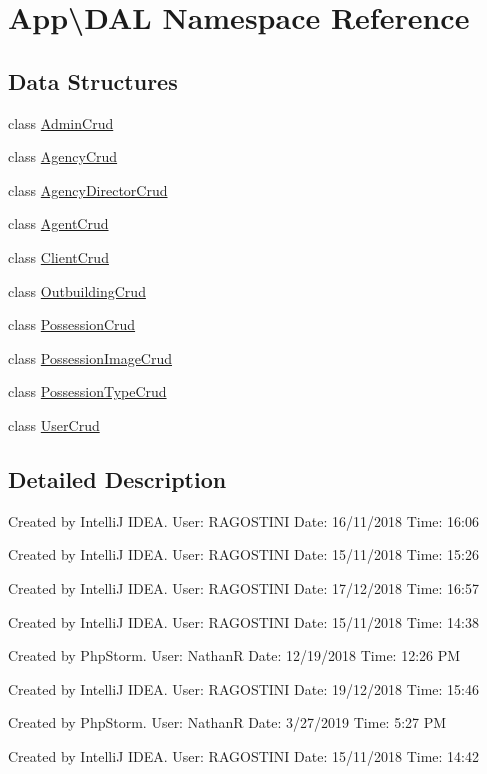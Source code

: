\hypertarget{namespace_app_1_1_d_a_l}{}\section{App\textbackslash{}D\+AL Namespace Reference}
\label{namespace_app_1_1_d_a_l}
\subsection*{Data Structures}
\begin{DoxyCompactItemize}
\item 
class \mbox{\hyperlink{class_app_1_1_d_a_l_1_1_admin_crud}{Admin\+Crud}}
\item 
class \mbox{\hyperlink{class_app_1_1_d_a_l_1_1_agency_crud}{Agency\+Crud}}
\item 
class \mbox{\hyperlink{class_app_1_1_d_a_l_1_1_agency_director_crud}{Agency\+Director\+Crud}}
\item 
class \mbox{\hyperlink{class_app_1_1_d_a_l_1_1_agent_crud}{Agent\+Crud}}
\item 
class \mbox{\hyperlink{class_app_1_1_d_a_l_1_1_client_crud}{Client\+Crud}}
\item 
class \mbox{\hyperlink{class_app_1_1_d_a_l_1_1_outbuilding_crud}{Outbuilding\+Crud}}
\item 
class \mbox{\hyperlink{class_app_1_1_d_a_l_1_1_possession_crud}{Possession\+Crud}}
\item 
class \mbox{\hyperlink{class_app_1_1_d_a_l_1_1_possession_image_crud}{Possession\+Image\+Crud}}
\item 
class \mbox{\hyperlink{class_app_1_1_d_a_l_1_1_possession_type_crud}{Possession\+Type\+Crud}}
\item 
class \mbox{\hyperlink{class_app_1_1_d_a_l_1_1_user_crud}{User\+Crud}}
\end{DoxyCompactItemize}


\subsection{Detailed Description}
Created by IntelliJ I\+D\+EA. User\+: R\+A\+G\+O\+S\+T\+I\+NI Date\+: 16/11/2018 Time\+: 16\+:06

Created by IntelliJ I\+D\+EA. User\+: R\+A\+G\+O\+S\+T\+I\+NI Date\+: 15/11/2018 Time\+: 15\+:26

Created by IntelliJ I\+D\+EA. User\+: R\+A\+G\+O\+S\+T\+I\+NI Date\+: 17/12/2018 Time\+: 16\+:57

Created by IntelliJ I\+D\+EA. User\+: R\+A\+G\+O\+S\+T\+I\+NI Date\+: 15/11/2018 Time\+: 14\+:38

Created by Php\+Storm. User\+: NathanR Date\+: 12/19/2018 Time\+: 12\+:26 PM

Created by IntelliJ I\+D\+EA. User\+: R\+A\+G\+O\+S\+T\+I\+NI Date\+: 19/12/2018 Time\+: 15\+:46

Created by Php\+Storm. User\+: NathanR Date\+: 3/27/2019 Time\+: 5\+:27 PM

Created by IntelliJ I\+D\+EA. User\+: R\+A\+G\+O\+S\+T\+I\+NI Date\+: 15/11/2018 Time\+: 14\+:42 